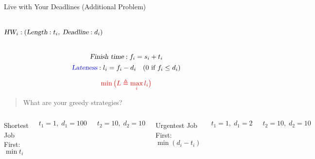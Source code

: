 
\begin{frame}{}
  \begin{exampleblock}{Live with Your Deadlines (Additional Problem)}
    \begin{columns}
        \pause
        \pause
	\[
	  \textsl{HW}_{i}: (\textsl{Length}: t_{i},\; \textsl{Deadline}: d_{i})
	\]
	\vspace{-0.60cm}
    \end{columns}
  \end{exampleblock}

  \pause
  \[
    \textsl{Finish time}: f_{i} = s_{i} + t_{i}
  \]
  \[
    \textcolor{blue}{\textsl{Lateness}}: l_i = f_{i} - d_{i} \quad (0 \text{ if } f_{i} \le d_{i})
  \]

  \pause
  \[
    \textcolor{red}{\min \big(L \triangleq \max_{i} l_i\big)}
  \]
\end{frame}

\begin{frame}{}
  \begin{quote}
    \centering
    {\Large What are your greedy strategies?}
  \end{quote}

\end{frame}

\begin{frame}{}
  \begin{columns}
      \centerline{\large Shortest Job First: $\min t_{i}$}

      \pause
      \vspace{0.50cm}
      \[
	t_1 = 1,\; d_1 = 100
      \]

      \[
	t_2 = 10,\; d_2 = 10
      \]
      \centerline{\large Urgentest Job First: $\min (d_{i} - t_{i})$}

      \pause
      \vspace{0.50cm}
      \[
	t_1 = 1,\; d_1 = 2
      \]

      \[
	t_2 = 10,\; d_2 = 10
      \]
  \end{columns}
\end{frame}

